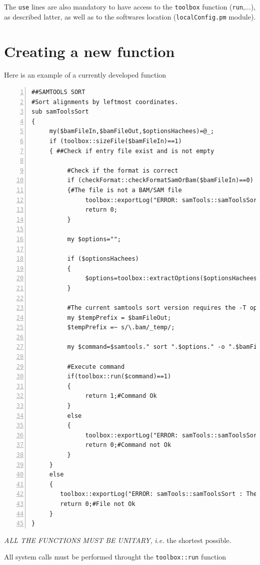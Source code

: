 \documentclass[a4paper,10pt]{report}
\begin{document}
The \texttt{use} lines are also mandatory to have access to the \texttt{toolbox} function (\texttt{run},...), as described latter, as well as to the softwares location (\texttt{localConfig.pm} module).


\chapter{Creating a new function}

Here is an example of a currently developed function
\sloppy
\begin{lstlisting}[numbers=left]
##SAMTOOLS SORT
#Sort alignments by leftmost coordinates.
sub samToolsSort
{
     my($bamFileIn,$bamFileOut,$optionsHachees)=@_;
     if (toolbox::sizeFile($bamFileIn)==1)
     { ##Check if entry file exist and is not empty
          
          #Check if the format is correct
          if (checkFormat::checkFormatSamOrBam($bamFileIn)==0)
          {#The file is not a BAM/SAM file
               toolbox::exportLog("ERROR: samTools::samToolsSort : The file $bamFileIn is not a SAM/BAM file\n",0);
               return 0;
          }
          
          my $options="";
          
          if ($optionsHachees)
          {
               $options=toolbox::extractOptions($optionsHachees);
          }
          
          #The current samtools sort version requires the -T option, ie temp prefix
          my $tempPrefix = $bamFileOut;
          $tempPrefix =~ s/\.bam/_temp/;
          
          my $command=$samtools." sort ".$options." -o ".$bamFileOut." -T ".$tempPrefix." ".$bamFileIn;
          
          #Execute command
          if(toolbox::run($command)==1)
          {
               return 1;#Command Ok
          }
          else
          {
               toolbox::exportLog("ERROR: samTools::samToolsSort : Uncorrectly done\n",0);
               return 0;#Command not Ok
          }
     }
     else
     {
        toolbox::exportLog("ERROR: samTools::samToolsSort : The file $bamFileIn is uncorrect\n",0);
        return 0;#File not Ok
     }
}

\end{lstlisting}

\emph{ALL THE FUNCTIONS MUST BE UNITARY}, \textit{i.e.} the shortest possible.

All system calls must be performed throught the \texttt{toolbox::run} function
\end{document}
